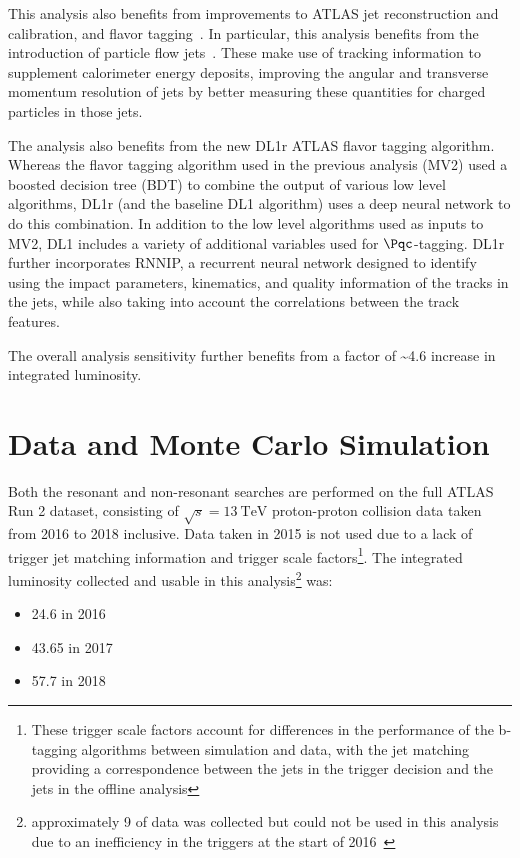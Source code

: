 This analysis also benefits from improvements to ATLAS jet reconstruction and
calibration, and flavor tagging~\cite{FTAG-2018-01}. In particular, this
analysis benefits from the introduction of particle flow
jets~\cite{PERF-2015-09}. These make use of tracking information to supplement
calorimeter energy deposits, improving the angular and transverse momentum
resolution of jets by better measuring these quantities for charged particles in
those jets.

The analysis also benefits from the new DL1r ATLAS flavor tagging algorithm.
Whereas the flavor tagging algorithm used in the previous analysis (MV2) used a
boosted decision tree (BDT) to combine the output of various low level
algorithms, DL1r (and the baseline DL1 algorithm) uses a deep neural network to
do this combination. In addition to the low level algorithms used as inputs to
MV2, DL1 includes a variety of additional variables used for $\Pqc$-tagging. DL1r
further incorporates RNNIP, a recurrent neural network designed
to identify \bjets using the impact parameters, kinematics, and quality
information of the tracks in the jets, while also taking into account the
correlations between the track features.

The overall analysis sensitivity further benefits from a factor of
\textasciitilde 4.6 increase in integrated luminosity.

\section{Data and Monte Carlo Simulation}
Both the resonant and non-resonant searches are performed on the full ATLAS Run 2 dataset, consisting of 
$\sqrt{s} = \SI{13}{\TeV}$ proton-proton collision data taken from 2016 to 2018 inclusive. Data taken in 2015 
is not used due to a lack of trigger jet matching
information and \bjet trigger scale factors\footnote{These trigger scale factors account for differences 
in the performance of the b-tagging algorithms between simulation and data, with the jet matching providing a 
correspondence between the jets in the trigger decision and the jets in the offline analysis}. The integrated 
luminosity collected
and usable in this analysis\footnote{\label{foot:lost-lumi}approximately
  \SI{9}{\ifb} of data was collected but could not be used in this analysis due
  to an inefficiency in the \bjet triggers at the start of 2016~\cite{ATL-COM-DAQ-2019-150}} was:
\begin{itemize}
  \item \SI{24.6}{\ifb} in 2016
  \item \SI{43.65}{\ifb} in 2017
  \item \SI{57.7}{\ifb} in 2018
\end{itemize}

